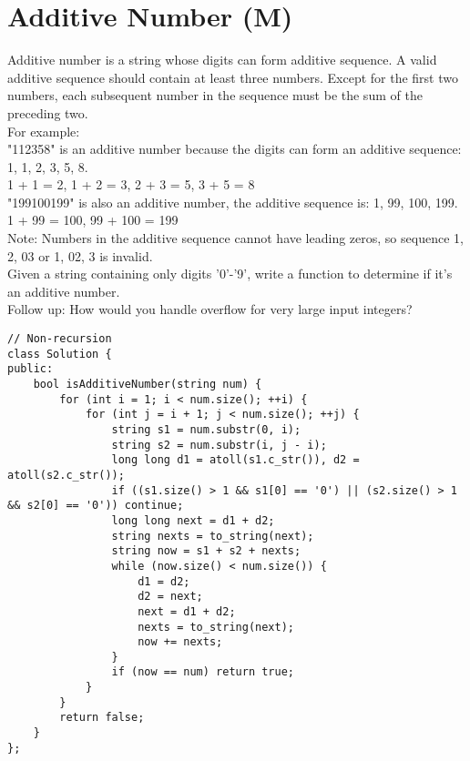 \section{Additive Number (M)}
Additive number is a string whose digits can form additive sequence. A valid additive sequence should contain at least three numbers. Except for the first two numbers, each subsequent number in the sequence must be the sum of the preceding two.\\

For example:\\

"112358" is an additive number because the digits can form an additive sequence: 1, 1, 2, 3, 5, 8.\\
1 + 1 = 2, 1 + 2 = 3, 2 + 3 = 5, 3 + 5 = 8\\

"199100199" is also an additive number, the additive sequence is: 1, 99, 100, 199.\\
1 + 99 = 100, 99 + 100 = 199\\

Note: Numbers in the additive sequence cannot have leading zeros, so sequence 1, 2, 03 or 1, 02, 3 is invalid.\\

Given a string containing only digits '0'-'9', write a function to determine if it's an additive number.\\

Follow up:
How would you handle overflow for very large input integers? \\

\begin{lstlisting}
// Non-recursion
class Solution {
public:
    bool isAdditiveNumber(string num) {
        for (int i = 1; i < num.size(); ++i) {
            for (int j = i + 1; j < num.size(); ++j) {
                string s1 = num.substr(0, i);
                string s2 = num.substr(i, j - i);
                long long d1 = atoll(s1.c_str()), d2 = atoll(s2.c_str());
                if ((s1.size() > 1 && s1[0] == '0') || (s2.size() > 1 && s2[0] == '0')) continue;
                long long next = d1 + d2;
                string nexts = to_string(next);
                string now = s1 + s2 + nexts;
                while (now.size() < num.size()) {
                    d1 = d2;
                    d2 = next;
                    next = d1 + d2;
                    nexts = to_string(next);
                    now += nexts;
                }
                if (now == num) return true;
            }
        }
        return false;
    }
};
\end{lstlisting}


